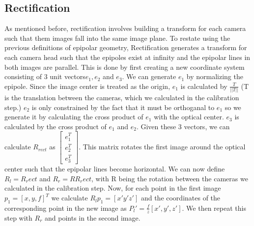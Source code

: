 \subsection{Rectification}
As mentioned before, rectification involves building a transform for each camera such that them images fall into the same image plane.  To restate using the previous definitions of epipolar geometry, Rectification generates a transform for each camera head such that the epipoles exist at infinity and the epipolar lines in both images are parallel.  This is done by first creating a new coordinate system consisting of 3 unit vectors$e_1, e_2$ and $e_3$.  We can generate $e_1$ by normalizing the epipole.  Since the image center is treated as the origin, $e_1$ is calculated by $\frac{T}{||T||}$ (T is the translation between the cameras, which we calculated in the calibration step.)  $e_2$ is only constrained by the fact that it must be orthoganal to $e_1$ so we generate it by calculating the cross product of $e_1$ with the optical center.  $e_3$ is calculated by the cross product of $e_1$ and $e_2$.  Given these 3 vectors, we can calculate $R_{rect}$ as $\begin{bmatrix} e_1^T \\ e_2^T \\ e_3^T \end{bmatrix}$.  This matrix rotates the first image around the optical center such that the epipolar lines become horizontal.  We can now define $R_l= R_rect$ and $R_r = RR_rect$, with R being the rotation between the cameras we calculated in the calibration step.  Now, for each point in the first image $p_1 = [x, y, f]^T$ we calculate $R_lp_1 = [x'y'z']$ and the coordinates of the corresponding point in the new image as $P_l' = \frac{f}{z}[x',y',z']$.  We then repeat this step with $R_r$ and points in the second image.



